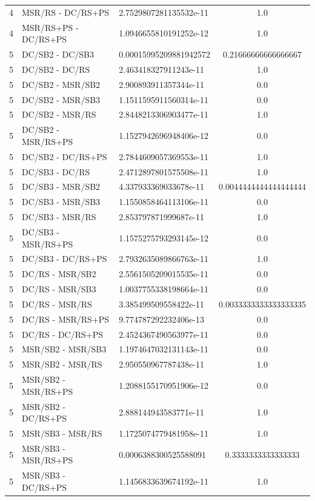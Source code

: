\documentclass[10pt,a4paper]{article}
\begin{document}
\begin{longtable}{c l l c}
4 & MSR/RS - DC/RS+PS & 2.7529807281135532e-11 & 1.0 \\
4 & MSR/RS+PS - DC/RS+PS & 1.0946655810191252e-12 & 1.0 \\
\midrule
5 & DC/SB2 - DC/SB3 & 0.00015995209881942572 & 0.21666666666666667 \\
5 & DC/SB2 - DC/RS & 2.463418327911243e-11 & 1.0 \\
5 & DC/SB2 - MSR/SB2 & 2.900893911357344e-11 & 0.0 \\
5 & DC/SB2 - MSR/SB3 & 1.1511595911560314e-11 & 0.0 \\
5 & DC/SB2 - MSR/RS & 2.8448213306903477e-11 & 1.0 \\
5 & DC/SB2 - MSR/RS+PS & 1.1527942696948406e-12 & 0.0 \\
5 & DC/SB2 - DC/RS+PS & 2.7844609057369553e-11 & 1.0 \\
5 & DC/SB3 - DC/RS & 2.4712897801575508e-11 & 1.0 \\
5 & DC/SB3 - MSR/SB2 & 4.337933369033678e-11 & 0.0044444444444444444 \\
5 & DC/SB3 - MSR/SB3 & 1.1550858464113106e-11 & 0.0 \\
5 & DC/SB3 - MSR/RS & 2.853797871999687e-11 & 1.0 \\
5 & DC/SB3 - MSR/RS+PS & 1.1575275793293145e-12 & 0.0 \\
5 & DC/SB3 - DC/RS+PS & 2.7932635089866763e-11 & 1.0 \\
5 & DC/RS - MSR/SB2 & 2.5561505209015535e-11 & 0.0 \\
5 & DC/RS - MSR/SB3 & 1.0037755338198664e-11 & 0.0 \\
5 & DC/RS - MSR/RS & 3.385499509558422e-11 & 0.0033333333333333335 \\
5 & DC/RS - MSR/RS+PS & 9.774787292232406e-13 & 0.0 \\
5 & DC/RS - DC/RS+PS & 2.4524367490563977e-11 & 0.0 \\
5 & MSR/SB2 - MSR/SB3 & 1.1974647032131143e-11 & 0.0 \\
5 & MSR/SB2 - MSR/RS & 2.950550967787438e-11 & 1.0 \\
5 & MSR/SB2 - MSR/RS+PS & 1.2088155170951906e-12 & 0.0 \\
5 & MSR/SB2 - DC/RS+PS & 2.888144943583771e-11 & 1.0 \\
5 & MSR/SB3 - MSR/RS & 1.1725074779481958e-11 & 1.0 \\
5 & MSR/SB3 - MSR/RS+PS & 0.0006388300525588091 & 0.3333333333333333 \\
5 & MSR/SB3 - DC/RS+PS & 1.1456833639674192e-11 & 1.0 \\

\end{longtable}
\end{document}

